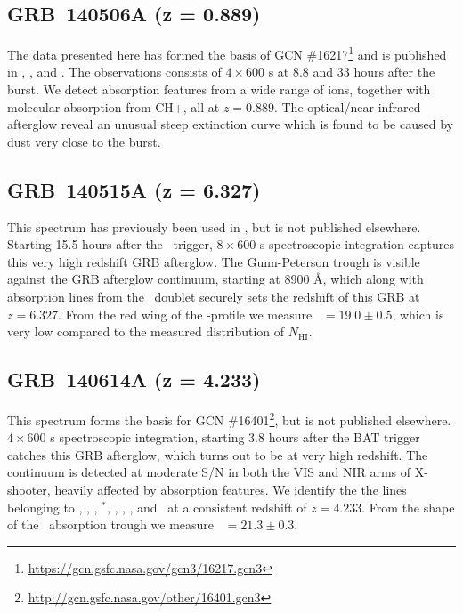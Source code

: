 \documentclass{aa}    %
\begin{document}
\subsection{GRB~140506A  (z = 0.889)} 

The data presented here has formed the basis of GCN
\#16217\footnote{\url{https://gcn.gsfc.nasa.gov/gcn3/16217.gcn3}} and is
published in \citet{Fynbo2014}, \citet{Kruhler2015}, and \citet{Heintz2017a}.
The observations consists of $4\times 600$ s at 8.8 and 33 hours after the
burst. We detect absorption features from a wide range of ions, together with
molecular absorption from CH+, all at $z=0.889$. The optical/near-infrared
afterglow reveal an unusual steep extinction curve which is found to be caused
by dust very close to the burst.

\subsection{GRB~140515A (z = 6.327)}	

This spectrum has previously been used in \citet{Melandri2015}, but is not
published elsewhere. Starting 15.5 hours after the \swift~trigger, $8\times600$
s spectroscopic integration captures this very high redshift GRB afterglow. The
Gunn-Peterson trough is visible against the GRB afterglow continuum, starting at
8900 \AA, which along with absorption lines from the \mgii~doublet securely sets
the redshift of this GRB at $z = 6.327$. From the red wing of the \lya-profile
we measure \nh~$=19.0 \pm 0.5$, which is very low compared to the measured
distribution of $N_{\mathrm{HI}}$.

\subsection{GRB~140614A (z = 4.233)}	

This spectrum forms the basis for GCN
\#16401\footnote{\url{http://gcn.gsfc.nasa.gov/other/16401.gcn3}}, but is not
published elsewhere. $4\times600$ s spectroscopic integration, starting 3.8
hours after the BAT trigger catches this GRB afterglow, which turns out to be at
very high redshift. The continuum is detected at moderate S/N in both the VIS
and NIR arms of X-shooter, heavily affected by absorption features. We identify
the the lines belonging to \lya, \SIii, \cii, \cii$^*$, \alii, \aliii, \feii,
and \mgii~at a consistent redshift of $z = 4.233$. From the shape of the
\lya~absorption trough we measure \nh~$=21.3 \pm 0.3$.
\end{document}
